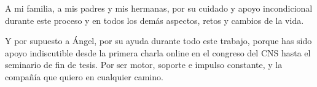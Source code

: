 A mi familia, a mis padres y mis hermanas, por su cuidado y apoyo incondicional durante este proceso y en todos los demás aspectos, retos y cambios de la vida. 

Y por supuesto a Ángel, por su ayuda durante todo este trabajo, porque has sido apoyo indiscutible desde la primera charla online en el congreso del CNS hasta el seminario de fin de tesis. Por ser motor, soporte e impulso constante, y la compañía que quiero en cualquier camino.
